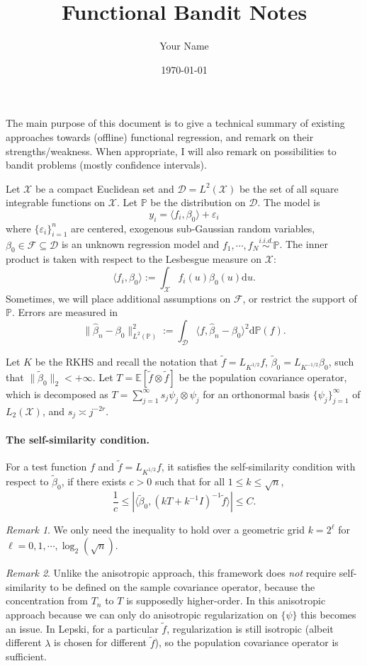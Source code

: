 \documentclass[11pt,a4paper]{article}
\title{Functional Bandit Notes}
\author{Your Name}
\date{\today}
\renewcommand{\hat}{\widehat}
\renewcommand{\tilde}{\widetilde}
\theoremstyle{definition}
\theoremstyle{plain}
\theoremstyle{remark}
\newtheorem{remark}{Remark}[section]
\newcommand{\mX}{\mathcal X}
\newcommand{\mD}{\mathcal D}
\newcommand{\bP}{\mathbb P}
\newcommand{\lp}{L^2(\bP)}
\newcommand{\ud}{\mathrm d}
\begin{document}
The main purpose of this document is to give a technical summary of existing approaches towards (offline) functional regression,
and remark on their strengths/weakness. When appropriate, I will also remark on possibilities to bandit problems (mostly confidence intervals).

Let $\mX$ be a compact Euclidean set and $\mD=L^2(\mX)$ be the set of all square integrable functions on $\mX$.
Let $\mathbb P$ be the distribution on $\mD$. The model is 
$$
y_i = \langle f_i, \beta_0\rangle + \varepsilon_i
$$
where $\{\varepsilon_i\}_{i=1}^n$ are centered, exogenous sub-Gaussian random variables, $\beta_0\in\mathcal F\subseteq \mD$ is an unknown regression model and $f_1,\cdots,f_N\overset{i.i.d.}{\sim}\mathbb P$.
The inner product is taken with respect to the Lesbesgue measure on $\mX$:
$$
\langle f_i, \beta_0\rangle := \int_{\mX} f_i(u)\beta_0(u)\ud u.
$$
Sometimes, we will place additional assumptions on $\mathcal F$, or restrict the support of $\bP$.
Errors are measured in 
$$
\|\hat \beta_n-\beta_0\|_{\lp}^2 := \int_{\mD} \langle f, \hat \beta_n-\beta_0\rangle^2\ud\bP(f).
$$

Let $K$ be the RKHS and recall the notation that $\tilde f = L_{K^{1/2}}f$, $\tilde\beta_0=L_{K^{-1/2}}\beta_0$, such that $\|\tilde\beta_0\|_2 < +\infty$.
Let $T=\mathbb E[\tilde f\otimes \tilde f]$ be the population covariance operator, which is decomposed as $T=\sum_{j=1}^{\infty}s_j\psi_j\otimes\psi_j$ for an orthonormal basis $\{\psi_j\}_{j=1}^{\infty}$ of $L_2(\mX)$,
and $s_j\asymp j^{-2r}$.

\paragraph{The self-similarity condition.}
For a test function $f$ and $\tilde f=L_{K^{1/2}}f$, it satisfies the self-similarity condition with respect to $\tilde\beta_0$, if there exists $c>0$ such that for all $1\leq k\leq \sqrt{n}$, 
$$
\frac{1}{c}\leq \left|\langle \tilde\beta_0, (k T+k^{-1}I)^{-1}\tilde f\rangle\right| \leq C.
$$

\begin{remark}
We only need the inequality to hold over a geometric grid $k=2^{\ell}$ for $\ell=0,1,\cdots,\log_2(\sqrt{n})$.
\end{remark}

\begin{remark}
Unlike the anisotropic approach, this framework does \emph{not} require self-similarity to be defined on the sample covariance operator, because the concentration from $T_n$ to $T$ is supposedly higher-order. In this anisotropic approach because we can only do anisotropic regularization on $\{\hat\psi\}$ this becomes an issue. In Lepski, for a particular $\tilde f$, regularization is still isotropic (albeit different $\lambda$ is chosen for different $\tilde f$), so the population covariance operator is sufficient.
\end{remark}
\end{document}
